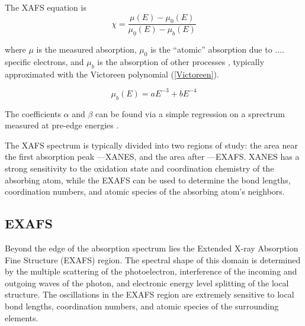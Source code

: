 The XAFS equation is 
\begin{equation}
    \label{XAFS}
    \chi = \dfrac{ \mu(E)- \mu_{0}(E)  }{  \mu_{0}(E) - \mu_{ b  }(E)  } 
\end{equation}

\noindent where $\mu$ is the measured absorption, $ \mu_0 $  is the ``atomic'' absorption due to .... specific electrons, and $ \mu_b $ 
is the absorption of other processes \cite{klementev2000xafs}, typically approximated with the Victoreen polynomial (\ref{Victoreen}).

\begin{equation}
    \label{Victoreen}
    \mu_b(E) = aE^{-3} + bE^{-4}
\end{equation}

\noindent The coefficients $ \alpha $ and $ \beta $ can be found via a simple regression on a sprectrum measured at pre-edge energies \cite{klementev2000xafs}. 

The XAFS spectrum is typically divided into two regions of study: the area near the first absorption peak ---XANES, and the area after ---EXAFS. XANES has a strong sensitivity to the oxidation state and coordination
chemistry of the absorbing atom, while the EXAFS
can be used to determine the bond lengths, coordination numbers, and atomic species of the absorbing atom's neighbors.

\subsection{EXAFS}
Beyond the edge of the absorption spectrum lies the Extended X-ray Absorption Fine Structure (EXAFS) region. The spectral shape of this domain is determined by the multiple scattering of the photoelectron, interference of the incoming and outgoing waves of the photon, and electronic energy level splitting of the local structure. The oscillations in the EXAFS region are extremely sensitive to local bond lengths, coordination numbers, and atomic species of the surrounding elements.


